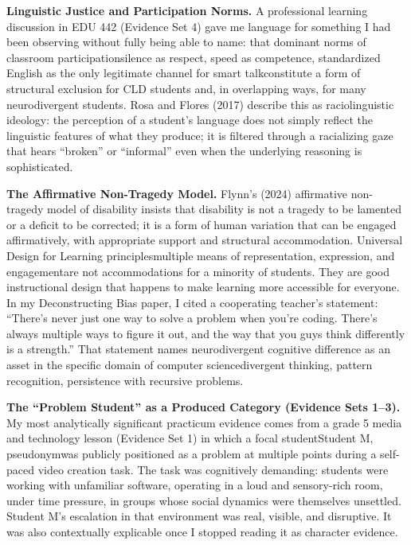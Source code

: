 \documentclass[12pt]{article}
\begin{document}
\textbf{Linguistic Justice and Participation Norms.}
A professional learning discussion in EDU 442 (Evidence Set 4) gave me language for something I had been observing without fully being able to name: that dominant norms of classroom participation\textemdash{}silence as respect, speed as competence, standardized English as the only legitimate channel for smart talk\textemdash{}constitute a form of structural exclusion for CLD students and, in overlapping ways, for many neurodivergent students. Rosa and Flores (2017) describe this as raciolinguistic ideology: the perception of a student's language does not simply reflect the linguistic features of what they produce; it is filtered through a racializing gaze that hears ``broken'' or ``informal'' even when the underlying reasoning is sophisticated.

\textbf{The Affirmative Non-Tragedy Model.}
Flynn's (2024) affirmative non-tragedy model of disability insists that disability is not a tragedy to be lamented or a deficit to be corrected; it is a form of human variation that can be engaged affirmatively, with appropriate support and structural accommodation. Universal Design for Learning principles\textemdash{}multiple means of representation, expression, and engagement\textemdash{}are not accommodations for a minority of students. They are good instructional design that happens to make learning more accessible for everyone. In my Deconstructing Bias paper, I cited a cooperating teacher's statement: ``There's never just one way to solve a problem when you're coding. There's always multiple ways to figure it out, and the way that you guys think differently is a strength.'' That statement names neurodivergent cognitive difference as an asset in the specific domain of computer science\textemdash{}divergent thinking, pattern recognition, persistence with recursive problems.

\newpage

\textbf{The ``Problem Student'' as a Produced Category (Evidence Sets 1--3).}
My most analytically significant practicum evidence comes from a grade 5 media and technology lesson (Evidence Set 1) in which a focal student\textemdash{}Student M, pseudonym\textemdash{}was publicly positioned as a problem at multiple points during a self-paced video creation task. The task was cognitively demanding: students were working with unfamiliar software, operating in a loud and sensory-rich room, under time pressure, in groups whose social dynamics were themselves unsettled. Student M's escalation in that environment was real, visible, and disruptive. It was also contextually explicable once I stopped reading it as character evidence.
\end{document}
